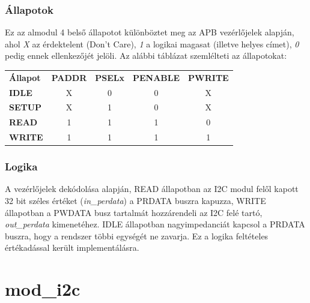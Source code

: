 \subsubsection{Állapotok}
    Ez az almodul 4 belső állapotot különböztet meg az APB vezérlőjelek alapján, ahol \emph{X} az érdektelent (Don't Care), \emph{1}  a logikai magasat (illetve helyes címet), \emph{0}  pedig ennek ellenkezőjét jelöli. Az alábbi táblázat szemlélteti az állapotokat:\\[2ex]

    \begin{tabular}{l|c|c|c|c}
        \textbf{Állapot}& \textbf{PADDR} & \textbf{PSELx} & \textbf{PENABLE}   & \textbf{PWRITE}    \\
        \textbf{IDLE}   &   X            & 0              & 0                  & X                  \\
        \textbf{SETUP}  &   X            & 1              & 0                  & X                  \\
        \textbf{READ}   &   1            & 1              & 1                  & 0                  \\
        \textbf{WRITE}  &   1            & 1              & 1                  & 1
    \end{tabular}

\subsubsection{Logika}
    A vezérlőjelek dekódolása alapján, READ állapotban az I2C modul felől kapott 32 bit széles értéket (\emph{in\_perdata}) a PRDATA buszra kapuzza, WRITE állapotban a PWDATA busz tartalmát hozzárendeli az I2C felé tartó, \emph{out\_perdata} kimenetéhez. IDLE állapotban nagyimpedanciát kapcsol a PRDATA buszra, hogy a rendszer többi egységét ne zavarja. Ez a logika feltételes értékadással került implementálásra.


\section{mod\_i2c}
